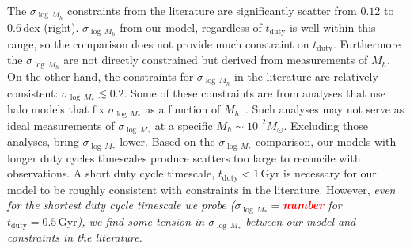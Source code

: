 \documentclass[12pt, letterpaper, preprint, tighten]{aastex}
\newcommand{\todo}[1]{{\bf \textcolor{red}{#1}}}
\begin{document}
The $\sigma_{\log\,M_h}$ constraints from the literature are significantly scatter 
from $0.12$ to $0.6\,\mathrm{dex}$ (right). $\sigma_{\log\,M_h}$ from our model, 
regardless of $t_\mathrm{duty}$ is well within this range, so the comparison does 
not provide much constraint on $t_\mathrm{duty}$. Furthermore the $\sigma_{\log\,M_h}$
are not directly constrained but derived from measurements of $M_h$. On the other
hand, the constraints for $\sigma_{\log\,M_h}$ in the literature are relatively 
consistent: $\sigma_{\log\,M_*} \lesssim 0.2$. Some of these constraints are from 
analyses that use halo models that fix $\sigma_{\log\,M_*}$ as a function of 
$M_h$~\citep{leauthaud2012, tinker2013, zu2015}. Such analyses may not serve 
as ideal measurements of $\sigma_{\log\,M_*}$ at a specific $M_h\sim 10^{12}M_\odot$.
Excluding those analyses, bring $\sigma_{\log\,M_*}$ lower. Based on the $\sigma_{\log\,M_*}$ 
comparison, our models with longer duty cycles timescales produce scatters too 
large to reconcile with observations. A short duty cycle timescale, $t_\mathrm{duty} < 1\,\mathrm{Gyr}$ 
is necessary for our model to be roughly consistent with constraints in the 
literature. However, \emph{even for the shortest duty cycle timescale we probe 
($\sigma_{\log\,M_*} = $\todo{number} for $t_\mathrm{duty} = 0.5\,\mathrm{Gyr}$), 
we find some tension in $\sigma_{\log\,M_*}$ between our model and constraints 
in the literature.}
\end{document}
